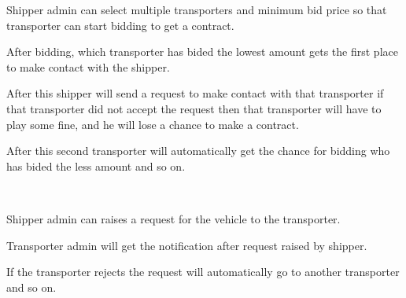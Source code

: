 \documentclass[]{deedy-resume-openfont}
\begin{document}
\begin{minipage}[t]{0.56\textwidth}
\begin{tightemize}
\item Shipper admin can select multiple transporters and minimum bid price so that transporter can start bidding to get a contract.
\item After bidding, which transporter has bided the lowest amount gets the first place to make contact with the shipper.
\item After this shipper will send a request to make contact with that transporter if that transporter did not accept the request then that transporter will have to play some fine, and he will lose a chance to make a contract.
\item After this second transporter will automatically get the chance for bidding who has bided the less amount and so on.
\end{tightemize}
\ \ \ \ \ \ 
\sectionsep

\descript{}
\begin{tightemize}
\item Shipper admin can raises a request for the vehicle to the transporter.
\item Transporter admin will get the notification after request raised by shipper.
\item If the transporter rejects the request will automatically go to another transporter and so on.
\end{tightemize}

\ \ \ \ \ \ 



\sectionsep

%
%

\end{minipage} 
\end{document}
